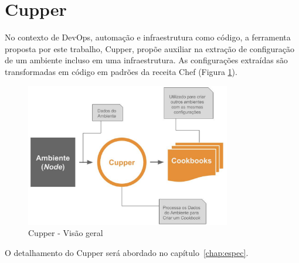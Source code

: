 \section{Cupper}
\label{sec:cupper}

No contexto de DevOps, automação e infraestrutura como código, a ferramenta
proposta por este trabalho, Cupper, propõe auxiliar na extração de configuração
de um ambiente incluso em uma infraestrutura. As configurações extraídas são
transformadas em código em padrões da receita Chef (Figura \ref{fig:cupper_geral}).

\begin{figure}[h]
  \label{fig:cupper_geral}
  \centering
  \includegraphics[width=0.8\textwidth]{figuras/cupper_geral.eps}
  \caption{Cupper - Visão geral}
\end{figure}

O detalhamento do Cupper será abordado no capítulo~\ref{chap:espec}.
